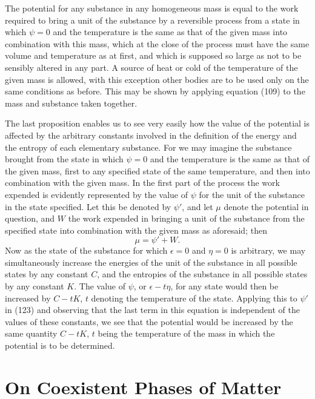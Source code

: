\documentclass[11pt]{article}
\newcommand{\eps}{\epsilon}
\begin{document}
The potential for any substance in any homogeneous mass is equal to the work required to bring a unit of the substance by a reversible process from a state in which \(\psi=0\) and the temperature is the same as that of the given mass into combination with this mass, which at the close of the process must have the same volume and temperature as at first, and which is supposed so large as not to be sensibly altered in any part. A source of heat or cold of the temperature of the given mass is allowed, with this exception other bodies are to be used only on the same conditions as before. This may be shown by applying equation (109) to the mass and substance taken together.

The last proposition enables us to see very easily how the value of the potential is affected by the arbitrary constants involved in the definition of the energy and the entropy of each elementary substance. For we may imagine the substance brought from the state in which \(\psi=0\) and the temperature is the same as that of the given mass, first to any specified state of the same temperature, and then into combination with the given mass. In the first part of the process the work expended is evidently represented by the value of \(\psi\) for the unit of the substance in the state specified. Let this be denoted by \(\psi'\), and let \(\mu\) denote the potential in question, and \(W\) the work expended in bringing a unit of the substance from the specified state into combination with the given mass as aforesaid; then
\begin{equation}
\mu=\psi'+W.
\end{equation}
Now as the state of the substance for which \(\eps=0\) and \(\eta=0\) is arbitrary, we may simultaneously increase the energies of the unit of the substance in all possible states by any constant \(C\), and the entropies of the substance in all possible states by any constant \(K\). The value of \(\psi\), or \(\eps-t\eta\), for any state would then be increased by \(C-tK\), \(t\) denoting the temperature of the state. Applying this to \(\psi'\) in (123) and observing that the last term in this equation is independent of the values of these constants, we see that the potential would be increased by the same quantity \(C-tK\), \(t\) being the temperature of the mass in which the potential is to be determined.

\section*{On Coexistent Phases of Matter}
\end{document}
